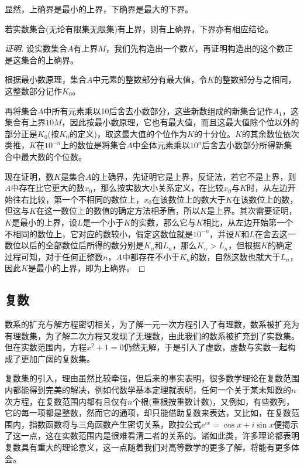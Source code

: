 显然，上确界是最小的上界，下确界是最大的下界。

\begin{theorem}[确界定理]
若实数集合(无论有限集无限集)有上界，则有上确界，下界亦有相应结论。
\end{theorem}

\begin{proof}[证明]
设实数集合$A$有上界$M$，我们先构造出一个数$K$，再证明构造出的这个数正是这集合的上确界。

根据最小数原理，集合$A$中元素的整数部分有最大值，令$K$的整数部分与之相同，这整数部分记作$K_0$。

再将集合$A$中所有元素乘以10后舍去小数部分，这些新数组成的新集合记作$A_1$，这集合有上界$10M$，因此按最小数原理，它也有最大值，而且这最大值除个位以外的部分正是$K_0$(按$K_0$的定义)，取这最大值的个位作为$K$的十分位。$K$的其余数位依次类推，$K$在$10^{-n}$上的数位是将集合$A$中全体元素乘以$10^n$后舍去小数部分所得新集合中最大数的个位数。

现在证明，数$K$是集合$A$的上确界，先证明它是上界，反证法，若它不是上界，则$A$中存在比它更大的数$x_0$，那么按实数大小关系定义，在比较$x_0$与$K$时，从左边开始往右比较，第一个不相同的数位上，$x_0$在该数位上的数大于$K$在该数位上的数，但这与$K$在这一数位上的数值的确定方法相矛盾，所以$K$是上界。其次需要证明，$K$是最小的上界，设$L$是一个小于$K$的实数，那么它与$K$相比，从左边开始第一个不相同的数位上，它对应的数较小，假定这数位就是$10^{-n}$，并设$K$和$L$在舍去这一数位以后的全部数位后所得的数分别是$K_n$和$L_n$，那么$K_n>L_n$，但根据$K$的确定过程可知，对于任何正整数$n$，$A$中都存在不小于$K_n$的数，自然这数也就大于$L_n$，因此$K$是最小的上界，即为上确界。
\end{proof}

\subsection{复数}
\label{sec:complex-number}

数系的扩充与解方程密切相关，为了解一元一次方程引入了有理数，数系被扩充为有理数集，为了解二次方程又发现了无理数，由此我们的数系被扩充到了实数集。但在实数范围内，方程$x^2+1=0$仍然无解，于是引入了虚数，虚数与实数一起构成了更加广阔的复数集。

复数集的引入，理由虽然比较牵强，但后来的事实表明，很多数学理论在复数范围内都能得到完美的解决，例如代数学基本定理就表明，任何一个关于某未知数的$n$次方程，在复数范围内都有且仅有$n$个根(重根按重数计数)，又例如，有些数列，它的每一项都是整数，然而它的通项，却只能借助复数来表达，又比如，在复数范围内，指数函数将与三角函数产生密切关系，欧拉公式$e^{ix}=\cos{x}+i\sin{x}$便揭示了这一点，这在实数范围内是很难看清二者的关系的。诸如此类，许多理论都表明复数具有重大的理论意义，这一点随着我们对高等数学的更多了解，将能有更多体会。

